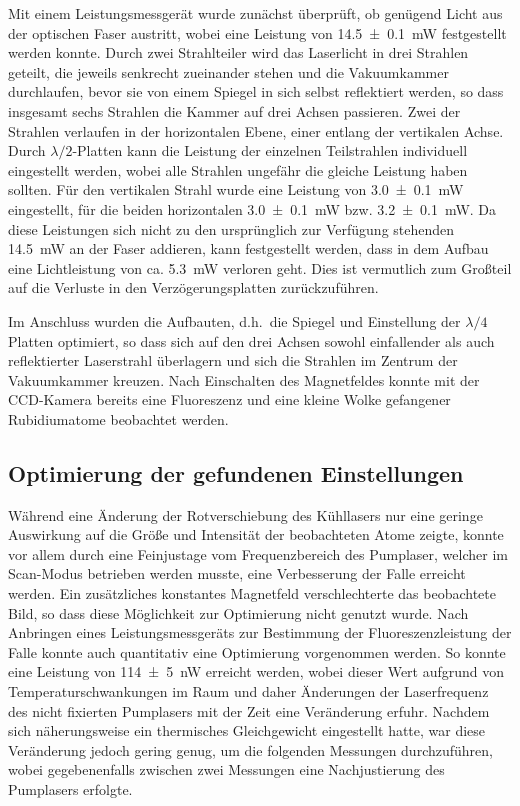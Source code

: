 \documentclass[11pt, a4paper]{article}
\numberwithin{equation}{section}
\begin{document}
Mit einem Leistungsmessgerät wurde zunächst überprüft, ob genügend Licht aus der optischen Faser austritt, wobei eine Leistung von \SI{14,5 +- 0.1}{mW} festgestellt werden konnte.
Durch zwei Strahlteiler wird das Laserlicht in drei Strahlen geteilt, die jeweils senkrecht zueinander stehen und die Vakuumkammer durchlaufen, bevor sie von einem Spiegel in sich selbst reflektiert werden, so dass insgesamt sechs Strahlen die Kammer auf drei Achsen passieren.
Zwei der Strahlen verlaufen in der horizontalen Ebene, einer entlang der vertikalen Achse.
Durch $\lambda/2$-Platten kann die Leistung der einzelnen Teilstrahlen individuell eingestellt werden, wobei alle Strahlen ungefähr die gleiche Leistung haben sollten.
Für den vertikalen Strahl wurde eine Leistung von \SI{3,0 +- 0.1}{mW} eingestellt, für die beiden horizontalen \SI{3,0 +- 0.1}{mW} bzw. \SI{3,2 +- 0.1}{mW}.
Da diese Leistungen sich nicht zu den ursprünglich zur Verfügung stehenden \SI{14,5}{mW} an der Faser addieren, kann festgestellt werden, dass in dem Aufbau eine Lichtleistung von ca. \SI{5,3}{mW} verloren geht.
Dies ist vermutlich zum Großteil auf die Verluste in den Verzögerungsplatten zurückzuführen.

Im Anschluss wurden die Aufbauten, d.h.\ die Spiegel und Einstellung der $\lambda/4$ Platten optimiert, so dass sich auf den drei Achsen sowohl einfallender als auch reflektierter Laserstrahl überlagern und sich die Strahlen im Zentrum der Vakuumkammer kreuzen.
Nach Einschalten des Magnetfeldes konnte mit der CCD-Kamera bereits eine Fluoreszenz und eine kleine Wolke gefangener Rubidiumatome beobachtet werden.

\subsection{Optimierung der gefundenen Einstellungen}

Während eine Änderung der Rotverschiebung des Kühllasers nur eine geringe Auswirkung auf die Größe und Intensität der beobachteten Atome zeigte, konnte vor allem durch eine Feinjustage vom Frequenzbereich des Pumplaser, welcher im Scan-Modus betrieben werden musste, eine Verbesserung der Falle erreicht werden.
Ein zusätzliches konstantes Magnetfeld verschlechterte das beobachtete Bild, so dass diese Möglichkeit zur Optimierung nicht genutzt wurde.
Nach Anbringen eines Leistungsmessgeräts zur Bestimmung der Fluoreszenzleistung der Falle konnte auch quantitativ eine Optimierung vorgenommen werden.
So konnte eine Leistung von \SI{114 +- 5}{nW} erreicht werden, wobei dieser Wert aufgrund von Temperaturschwankungen im Raum und daher Änderungen der Laserfrequenz des nicht fixierten Pumplasers mit der Zeit eine Veränderung erfuhr.
Nachdem sich näherungsweise ein thermisches Gleichgewicht eingestellt hatte, war diese Veränderung jedoch gering genug, um die folgenden Messungen durchzuführen, wobei gegebenenfalls zwischen zwei Messungen eine Nachjustierung des Pumplasers erfolgte.
\end{document}
